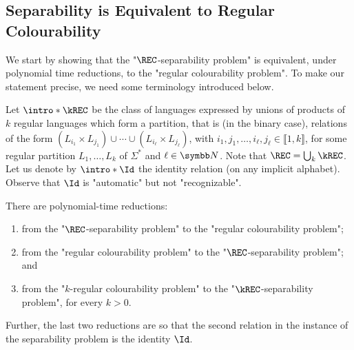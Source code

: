\subsection{Separability is Equivalent to Regular Colourability}

We start by showing that the "$\REC$-separability problem" is equivalent,
under polynomial time reductions, to the "regular colourability problem". To make our statement precise, we need some terminology introduced below. 

\AP Let $\intro*\kREC$ be the class of languages expressed by unions of products of $k$ regular languages which form a partition, that is (in the binary case), relations of the form $(L_{i_1} \times L_{j_1}) \cup \dotsb \cup (L_{i_\ell} \times L_{j_\ell})$, with $i_1,j_1,\hdots,i_\ell, j_\ell \in \lBrack 1,k \rBrack$, for some regular partition $L_1, \dotsc, L_{k}$ of $\Sigma^*$ and $\ell \in \N$.
\AP
Note that $\REC = \bigcup_k \kREC$.
\AP%
Let us denote by $\intro*\Id$ the identity relation (on any implicit alphabet). Observe that $\Id$ is "automatic" but not "recognizable".

\begin{theorem}
    \AP\label{thm:reg-colourability-equiv-separability}
    There are polynomial-time reductions: 
    \begin{enumerate}
        \item from the "$\REC$-separability problem" to the "regular colourability problem"; 
        \item from the "regular colourability problem" to the "$\REC$-separability problem"; and
        \item from the "$k$-regular colourability problem" to the "$\kREC$-separability problem", for every $k > 0$.
    \end{enumerate}
    Further, the last two reductions are so that the second relation in the instance of the separability problem is the identity $\Id$.
\end{theorem}
   
